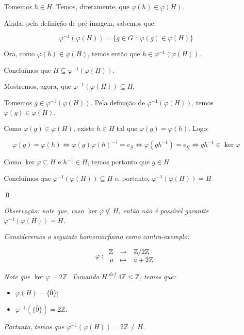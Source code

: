 \documentclass[16pt,openany]{book}
\theoremstyle{definition}
\begin{document}
Tomemos $h\in H$. Temos, diretamente, que $\varphi(h)\in\varphi(H)$.

Ainda, pela definição de pré-imagem, sabemos que:

\[
\varphi^{-1}(\varphi(H)) = \{g\in G\; :\; \varphi(g)\in \varphi(H)\}
\]

Ora, como $\varphi(h)\in \varphi(H)$, temos então que $h\in \varphi^{-1}(\varphi(H))$.

Concluímos que $H \subseteq \varphi^{-1}(\varphi(H))$.

Mostremos, agora, que $\varphi^{-1}(\varphi(H)) \subseteq H$.

Tomemos $g\in \varphi^{-1}(\varphi(H))$. Pela definição de $\varphi^{-1}(\varphi(H))$, temos $\varphi(g)\in\varphi(H)$.

Como $\varphi(g)\in\varphi(H)$, existe $h\in H$ tal que $\varphi(g) = \varphi(h)$. Logo:

\[
\varphi(g)=\varphi(h)\iff \varphi(g)\varphi(h)^{-1} = e_\mathcal{G} \iff \varphi(gh^{-1})= e_\mathcal{G} \iff gh^{-1}\in\ker{\varphi}
\]

Como $\ker{\varphi}\subseteq H$ e $h^{-1}\in H$, temos portanto que $g\in H$.

Concluímos que $\varphi^{-1}(\varphi(H)) \subseteq H$ e, portanto, $\varphi^{-1}(\varphi(H)) = H$

\qed

\textit{Observação: note que, caso $\ker{\varphi} \not\subseteq H$, então não é possível garantir $\varphi^{-1}(\varphi(H)) = H$.}

\textit{Consideremos o seguinte homomorfismo como contra-exemplo:}

\[
\varphi: 
\begin{array}{r c l}
\mathbb{Z}  &\to &\mathbb{Z}/2\mathbb{Z} \\
a &\mapsto & a + 2\mathbb{Z}
\end{array}
\]

\textit{Note que $\ker{\varphi} = 2\mathbb{Z}$. Tomando $H \overset{def}{=} 4\mathbb{Z}\leq \mathbb{Z}$, temos que:}

\begin{itemize}
  \item $\varphi(H) = \{\bar{0}\}$;
  \item $\varphi^{-1}(\{\bar{0}\}) = 2\mathbb{Z}$.
\end{itemize}

\textit{Portanto, temos que $\varphi^{-1}(\varphi(H)) = 2\mathbb{Z} \neq H$}.
\end{document}
